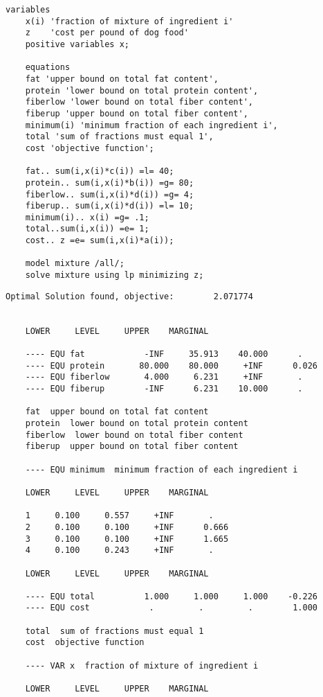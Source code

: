 \begin{enumerate}
\begin{solution}
\begin{Verbatim}[samepage=true]
	variables
	x(i) 'fraction of mixture of ingredient i'
	z    'cost per pound of dog food'
	positive variables x;
	
	equations
	fat 'upper bound on total fat content',
	protein 'lower bound on total protein content',
	fiberlow 'lower bound on total fiber content',
	fiberup 'upper bound on total fiber content',
	minimum(i) 'minimum fraction of each ingredient i',
	total 'sum of fractions must equal 1',
	cost 'objective function';
	
	fat.. sum(i,x(i)*c(i)) =l= 40;
	protein.. sum(i,x(i)*b(i)) =g= 80;
	fiberlow.. sum(i,x(i)*d(i)) =g= 4;
	fiberup.. sum(i,x(i)*d(i)) =l= 10;
	minimum(i).. x(i) =g= .1;
	total..sum(i,x(i)) =e= 1;
	cost.. z =e= sum(i,x(i)*a(i));
	
	model mixture /all/;
	solve mixture using lp minimizing z;
	\end{Verbatim}
	
	\begin{Verbatim}[samepage=true]
	Optimal Solution found, objective:        2.071774
	
	
	LOWER     LEVEL     UPPER    MARGINAL
	
	---- EQU fat            -INF     35.913    40.000      .         
	---- EQU protein       80.000    80.000     +INF      0.026      
	---- EQU fiberlow       4.000     6.231     +INF       .         
	---- EQU fiberup        -INF      6.231    10.000      .         
	
	fat  upper bound on total fat content
	protein  lower bound on total protein content
	fiberlow  lower bound on total fiber content
	fiberup  upper bound on total fiber content
	
	---- EQU minimum  minimum fraction of each ingredient i
	
	LOWER     LEVEL     UPPER    MARGINAL
	
	1     0.100     0.557     +INF       .         
	2     0.100     0.100     +INF      0.666      
	3     0.100     0.100     +INF      1.665      
	4     0.100     0.243     +INF       .         
	
	LOWER     LEVEL     UPPER    MARGINAL
	
	---- EQU total          1.000     1.000     1.000    -0.226      
	---- EQU cost            .         .         .        1.000      
	
	total  sum of fractions must equal 1
	cost  objective function
	
	---- VAR x  fraction of mixture of ingredient i
	
	LOWER     LEVEL     UPPER    MARGINAL
	

\end{Verbatim}
\end{solution}
\end{enumerate}
